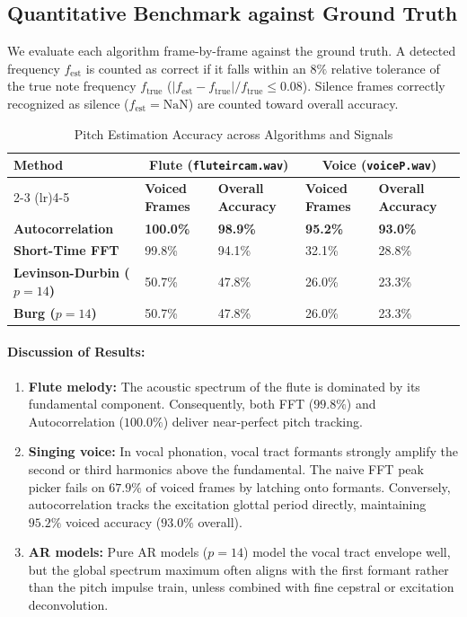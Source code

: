 \documentclass{rapportCS}
\begin{document}
\subsection{Quantitative Benchmark against Ground Truth}

We evaluate each algorithm frame-by-frame against the ground truth. A detected frequency $f_{\text{est}}$ is counted as correct if it falls within an $8\%$ relative tolerance of the true note frequency $f_{\text{true}}$ ($|f_{\text{est}} - f_{\text{true}}| / f_{\text{true}} \le 0.08$). Silence frames correctly recognized as silence ($f_{\text{est}} = \text{NaN}$) are counted toward overall accuracy.

\begin{table}[H]
    \centering
    \caption{Pitch Estimation Accuracy across Algorithms and Signals}
    \label{tab:pitch_benchmark}
    \begin{tabularx}{\textwidth}{lXXXX}
        \toprule
        \textbf{Method} & \multicolumn{2}{c}{\textbf{Flute (\texttt{fluteircam.wav})}} & \multicolumn{2}{c}{\textbf{Voice (\texttt{voiceP.wav})}} \\
        \cmidrule(lr){2-3} \cmidrule(lr){4-5}
        & \textbf{Voiced Frames} & \textbf{Overall Accuracy} & \textbf{Voiced Frames} & \textbf{Overall Accuracy} \\
        \midrule
        \textbf{Autocorrelation} & \textbf{100.0\%} & \textbf{98.9\%} & \textbf{95.2\%} & \textbf{93.0\%} \\
        \textbf{Short-Time FFT}   & 99.8\% & 94.1\% & 32.1\% & 28.8\% \\
        \textbf{Levinson-Durbin ($p=14$)} & 50.7\% & 47.8\% & 26.0\% & 23.3\% \\
        \textbf{Burg ($p=14$)}    & 50.7\% & 47.8\% & 26.0\% & 23.3\% \\
        \bottomrule
    \end{tabularx}
\end{table}

\paragraph{Discussion of Results:}
\begin{enumerate}
    \item \textbf{Flute melody:} The acoustic spectrum of the flute is dominated by its fundamental component. Consequently, both FFT ($99.8\%$) and Autocorrelation ($100.0\%$) deliver near-perfect pitch tracking.
    \item \textbf{Singing voice:} In vocal phonation, vocal tract formants strongly amplify the second or third harmonics above the fundamental. The naive FFT peak picker fails on $67.9\%$ of voiced frames by latching onto formants. Conversely, autocorrelation tracks the excitation glottal period directly, maintaining $95.2\%$ voiced accuracy ($93.0\%$ overall).
    \item \textbf{AR models:} Pure AR models ($p=14$) model the vocal tract envelope well, but the global spectrum maximum often aligns with the first formant rather than the pitch impulse train, unless combined with fine cepstral or excitation deconvolution.
\end{enumerate}
\end{document}
